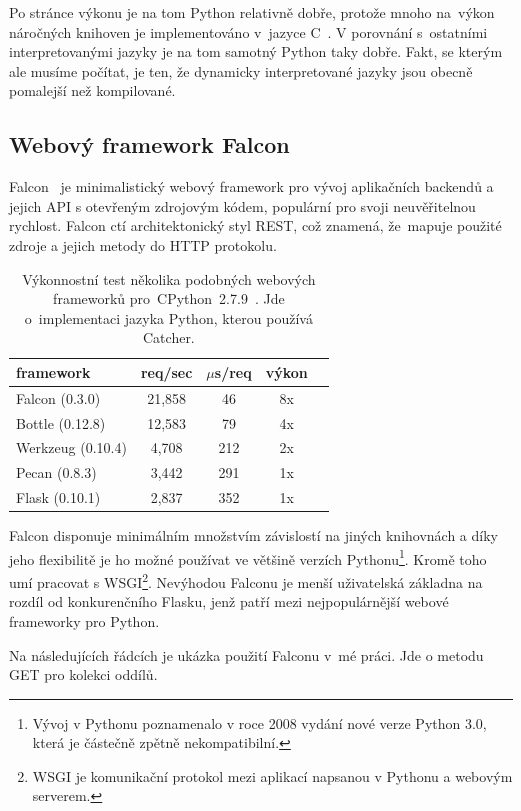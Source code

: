 Po stránce výkonu je na tom Python relativně dobře, protože mnoho na~výkon náročných knihoven je implementováno v~jazyce C~\cite{clanguage}.
V porovnání s~ostatními interpretovanými jazyky je na tom samotný Python taky dobře.
Fakt, se kterým ale musíme počítat, je ten, že dynamicky interpretované jazyky jsou obecně pomalejší než kompilované.

\subsection{Webový framework Falcon}

Falcon~\cite{falcon} je minimalistický webový framework pro vývoj aplikačních back\-endů a jejich API s otevřeným zdrojovým kódem,
populární pro svoji neuvěřitelnou rychlost. Falcon ctí architektonický styl REST, což znamená, že~mapuje použité
zdroje a jejich metody do HTTP protokolu.

\begin{table}[htb]
 \centering
 \begin{tabular}{|l||c|c|c|c|}\hline
 \bfseries \bfseries framework & \bfseries req/sec & \bfseries $\mu$s/req & \bfseries výkon \\[2mm]
 \hline
 Falcon (0.3.0) & 21,858 & 46 & 8x \\
 \hline
 Bottle (0.12.8) & 12,583 & 79 & 4x \\
 \hline
 Werkzeug (0.10.4) & 4,708 & 212 & 2x \\
 \hline
 Pecan (0.8.3) & 3,442 & 291 & 1x \\
 \hline
 Flask (0.10.1) & 2,837 & 352 & 1x \\
 \hline
 \end{tabular}
 \caption{Výkonnostní test několika podobných webových frameworků pro~CPython~2.7.9~\cite{falcon_benchmarks}.
 Jde o~implementaci jazyka Python, kterou používá Catcher.}
\end{table}

Falcon disponuje minimálním množstvím závislostí na jiných knihovnách a díky jeho flexibilitě je ho možné
používat ve většině verzích Pythonu\footnote{Vývoj v Pythonu poznamenalo v roce 2008 vydání nové verze Python 3.0,
která je částečně zpětně nekompatibilní.}. Kromě toho umí pracovat s WSGI\footnote{WSGI je komunikační protokol
mezi aplikací napsanou v Pythonu a webovým serverem.}. Nevýhodou Falconu je menší uživatelská
základna na rozdíl od konkurenčního Flasku, jenž patří mezi nejpopulárnější webové frameworky pro Python.

Na následujících řádcích je ukázka použití Falconu v~mé práci. Jde o metodu GET pro kolekci oddílů.

